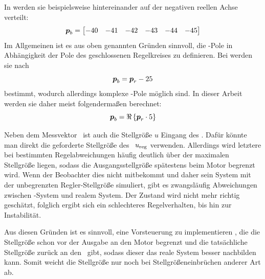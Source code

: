 In \cite{brehl} werden sie beispielsweise hintereinander auf der negativen reellen Achse verteilt:
	\[
	\boldsymbol{p}_b=\begin{bmatrix}
		-40 & -41 & -42 & -43 & -44 & -45
	\end{bmatrix}
\]
Im Allgemeinen ist es aus oben genannten Gründen sinnvoll, die \beob-Pole in Abhängigkeit der Pole des geschlossenen Regelkreises zu definieren.
Bei \cite{chang} werden sie nach
	\[
	\boldsymbol{p}_b = \boldsymbol{p}_r - 25
\]
bestimmt, wodurch allerdings komplexe \beob-Pole möglich sind. In dieser Arbeit werden sie daher meist folgendermaßen berechnet:
	\[
	\boldsymbol{p}_b = \Re\left\{{\boldsymbol{p}_r \cdot 5}\right\}
\]

Neben dem Messvektor \vey\ ist auch die Stellgröße $u$ Eingang des \beob. 
Dafür könnte man direkt die geforderte Stellgröße des \zsr\ $u_{\mathrm{reg}}$ verwenden.
Allerdings wird letztere bei bestimmten Regelabweichungen häufig deutlich über der maximalen Stellgröße liegen, sodass die Ausgangsstellgröße spätestens beim Motor begrenzt wird.
Wenn der Beobachter dies nicht mitbekommt und daher sein System mit der unbegrenzten Regler-Stellgröße simuliert, gibt es zwangsläufig Abweichungen zwischen \beob-System und realem System.
Der Zustand wird nicht mehr richtig geschätzt, folglich ergibt sich ein schlechteres Regelverhalten, bis hin zur Instabilität.

Aus diesen Gründen ist es sinnvoll, eine Vorsteuerung zu implementieren , die die Stellgröße schon vor der Ausgabe an den Motor begrenzt und die tatsächliche Stellgröße zurück an den \beob\ gibt, sodass dieser das reale System besser nachbilden kann.
Somit weicht die Stellgröße nur noch bei Stellgrößeneinbrüchen anderer Art  ab.


